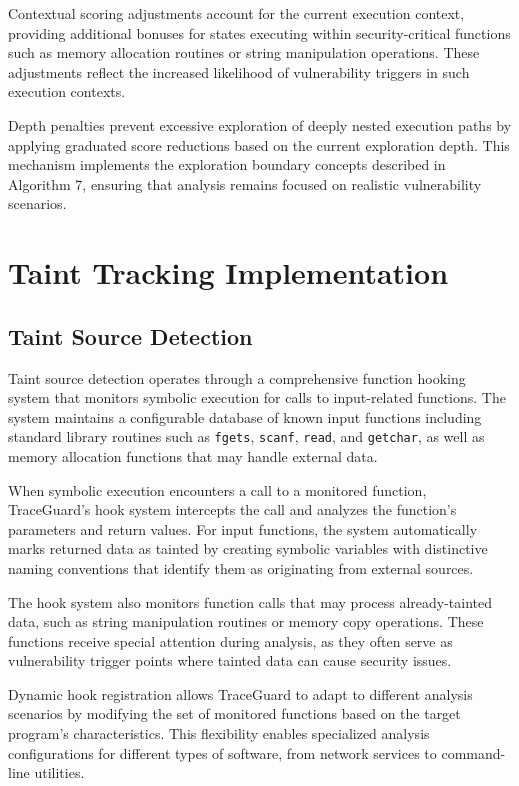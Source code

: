Contextual scoring adjustments account for the current execution context, providing additional bonuses for states executing within security-critical functions such as memory allocation routines or string manipulation operations. These adjustments reflect the increased likelihood of vulnerability triggers in such execution contexts.

Depth penalties prevent excessive exploration of deeply nested execution paths by applying graduated score reductions based on the current exploration depth. This mechanism implements the exploration boundary concepts described in Algorithm 7, ensuring that analysis remains focused on realistic vulnerability scenarios.

\section{Taint Tracking Implementation}

\subsection{Taint Source Detection}

Taint source detection operates through a comprehensive function hooking system that monitors symbolic execution for calls to input-related functions. The system maintains a configurable database of known input functions including standard library routines such as \texttt{fgets}, \texttt{scanf}, \texttt{read}, and \texttt{getchar}, as well as memory allocation functions that may handle external data.

When symbolic execution encounters a call to a monitored function, TraceGuard's hook system intercepts the call and analyzes the function's parameters and return values. For input functions, the system automatically marks returned data as tainted by creating symbolic variables with distinctive naming conventions that identify them as originating from external sources.

The hook system also monitors function calls that may process already-tainted data, such as string manipulation routines or memory copy operations. These functions receive special attention during analysis, as they often serve as vulnerability trigger points where tainted data can cause security issues.

Dynamic hook registration allows TraceGuard to adapt to different analysis scenarios by modifying the set of monitored functions based on the target program's characteristics. This flexibility enables specialized analysis configurations for different types of software, from network services to command-line utilities.

